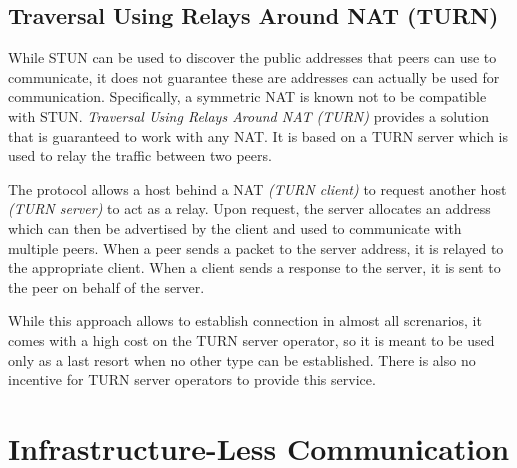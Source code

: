 \subsection{Traversal Using Relays Around NAT (TURN)}

While STUN can be used to discover the public addresses that peers can use to communicate, it does not guarantee these are addresses can actually be used for communication. Specifically, a symmetric NAT is known not to be compatible with STUN. \textit{Traversal Using Relays Around NAT (TURN)} provides a solution that is guaranteed to work with any NAT. It is based on a TURN server which is used to relay the traffic between two peers.

The protocol allows a host behind a NAT \textit{(TURN client)} to request another host \textit{(TURN server)} to act as a relay. Upon request, the server allocates an address which can then be advertised by the client and used to communicate with multiple peers. When a peer sends a packet to the server address, it is relayed to the appropriate client. When a client sends a response to the server, it is sent to the peer on behalf of the server.

While this approach allows to establish connection in almost all screnarios, it comes with a high cost on the TURN server operator, so it is meant to be used only as a last resort when no other type can be established. There is also no incentive for TURN server operators to provide this service.





\section{Infrastructure-Less Communication}

